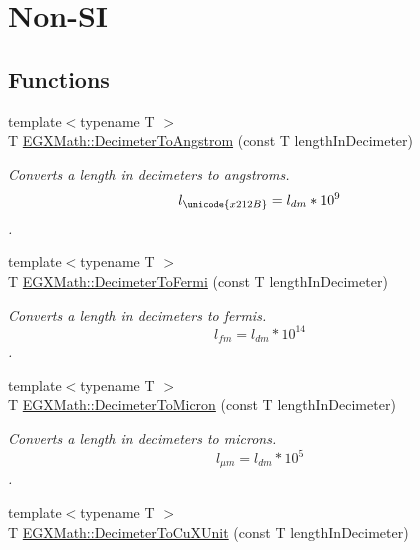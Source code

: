 \hypertarget{group___e_g_x_math-_conversions-_length_conversions-_decimeter-_non-_s_i}{}\section{Non-\/\+SI}
\label{group___e_g_x_math-_conversions-_length_conversions-_decimeter-_non-_s_i}
\subsection*{Functions}
\begin{DoxyCompactItemize}
\item 
{\footnotesize template$<$typename T $>$ }\\T \mbox{\hyperlink{group___e_g_x_math-_conversions-_length_conversions-_decimeter-_non-_s_i_gaffa5876e4f15bc859c369e8bfb9e4183}{E\+G\+X\+Math\+::\+Decimeter\+To\+Angstrom}} (const T length\+In\+Decimeter)
\begin{DoxyCompactList}\small\item\em Converts a length in decimeters to angstroms. \[ l_{\unicode{x212B}}=l_{dm} * 10^{9} \]. \end{DoxyCompactList}\item 
{\footnotesize template$<$typename T $>$ }\\T \mbox{\hyperlink{group___e_g_x_math-_conversions-_length_conversions-_decimeter-_non-_s_i_ga2163b07afe9c89c1a1150516f615ef2a}{E\+G\+X\+Math\+::\+Decimeter\+To\+Fermi}} (const T length\+In\+Decimeter)
\begin{DoxyCompactList}\small\item\em Converts a length in decimeters to fermis. \[ l_{fm}=l_{dm} * 10^{14} \]. \end{DoxyCompactList}\item 
{\footnotesize template$<$typename T $>$ }\\T \mbox{\hyperlink{group___e_g_x_math-_conversions-_length_conversions-_decimeter-_non-_s_i_gaebafc6e167156bb5158e5d335b25334b}{E\+G\+X\+Math\+::\+Decimeter\+To\+Micron}} (const T length\+In\+Decimeter)
\begin{DoxyCompactList}\small\item\em Converts a length in decimeters to microns. \[ l_{\mu m}=l_{dm} * 10^{5} \]. \end{DoxyCompactList}\item 
{\footnotesize template$<$typename T $>$ }\\T \mbox{\hyperlink{group___e_g_x_math-_conversions-_length_conversions-_decimeter-_non-_s_i_gab595b2398e8e838922b4591308466e87}{E\+G\+X\+Math\+::\+Decimeter\+To\+Cu\+X\+Unit}} (const T length\+In\+Decimeter)

\end{DoxyCompactItemize}
